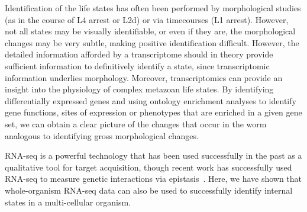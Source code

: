 Identification of the \cel{} life states has often been performed by
morphological studies (as in the course of L4 arrest or L2d) or via timecourses
(L1 arrest). However, not all states may be visually identifiable, or even if
they are, the morphological changes may be very subtle, making positive
identification difficult. However, the detailed information afforded by a
transcriptome should in theory provide sufficient information to definitively
identify a state, since transcriptomic information underlies morphology.
Moreover, transcriptomics can provide an insight into the
physiology of complex metazoan life states. By identifying differentially
expressed genes and using ontology enrichment analyses to identify gene
functions, sites of expression or phenotypes that are enriched in a given gene
set, we can obtain a clear picture of the changes that occur in the worm
analogous to identifying gross morphological changes.

RNA-seq is a powerful technology that has been used successfully in the past as
a qualitative tool for target acquisition, though recent work has successfully
used RNA-seq to measure genetic interactions via
epistasis~\citep{Dixit2016,AngelesAlboresHIF}. Here, we have shown that
whole-organism RNA-seq data can also be used to successfully identify internal
states in a multi-cellular organism.

%
